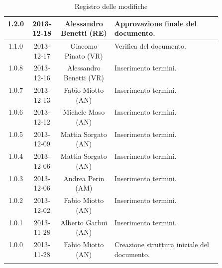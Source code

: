 \begin{center}
\begin{longtable}{|c|c|c|p{0.5\linewidth}|}
\midrule
1.2.0 & 2013-12-18 & Alessandro Benetti (RE) & Approvazione finale del documento.\\
\midrule
1.1.0 & 2013-12-17 & Giacomo Pinato (VR) & Verifica del documento. \\
\midrule
1.0.8 & 2013-12-16 & Alessandro Benetti (VR) & Inserimento termini.\\
\midrule
1.0.7 & 2013-12-13 & Fabio Miotto (AN) & Inserimento termini.\\
\midrule
1.0.6 & 2013-12-12 & Michele Maso (AN) & Inserimento termini.\\
\midrule
1.0.5 & 2013-12-09 & Mattia Sorgato (AN) & Inserimento termini.\\
\midrule
1.0.4 & 2013-12-06 & Mattia Sorgato (AN) & Inserimento termini. \\
\midrule
1.0.3 & 2013-12-06 & Andrea Perin (AM) & Inserimento termini.\\
\midrule
1.0.2 & 2013-12-02 & Fabio Miotto (AN) & Inserimento termini.\\
\midrule
1.0.1 & 2013-11-28 & Alberto Garbui (AN) & Inserimento termini.\\
\midrule
1.0.0 & 2013-11-28 & Fabio Miotto (AN) & Creazione struttura iniziale del documento.\\


\bottomrule
\caption{Registro delle modifiche}
\label{tab:changelog}
\end{longtable}
\end{center}


\newpage







